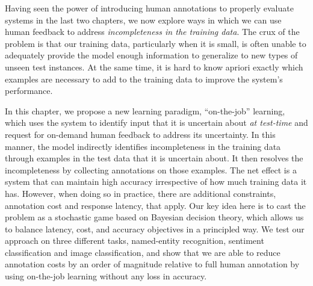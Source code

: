 Having seen the power of introducing human annotations to properly evaluate systems in the last two chapters, we now explore ways in which we can use human feedback to address \textit{incompleteness in the training data}.
The crux of the problem is that our training data, particularly when it is small, is often unable to adequately provide the model enough information to generalize to new types of unseen test instances. 
At the same time, it is hard to know apriori exactly which examples are necessary to add to the training data to improve the system's performance.

In this chapter, we propose a new learning paradigm, ``on-the-job'' learning, which uses the system to identify input that it is uncertain about \textit{at test-time} and request for on-demand human feedback to address its uncertainty.
In this manner, the model indirectly identifies incompleteness in the training data through examples in the test data that it is uncertain about.
It then resolves the incompleteness by collecting annotations on those examples.
The net effect is a system that can maintain high accuracy irrespective of how much training data it has. 
However, when doing so in practice, there are additional constraints, annotation cost and response latency, that apply.
Our key idea here is to cast the problem as a stochastic game based on Bayesian decision theory, which allows us to balance latency, cost, and accuracy objectives in a principled way.
We test our approach on three different tasks, named-entity recognition, sentiment classification and image classification, and show that we are able to reduce annotation costs by an order of magnitude relative to full human annotation by using on-the-job learning without any loss in accuracy.

